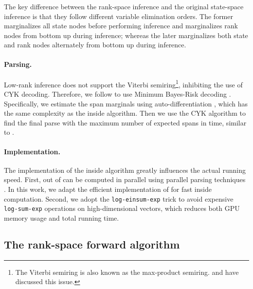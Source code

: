 \documentclass[11pt]{article}
\begin{document}
The key difference between the rank-space inference and the original state-space inference is that they follow different variable elimination orders. The former marginalizes all state nodes before performing inference and marginalizes rank nodes from bottom up during inference; whereas the later marginalizes both state and rank nodes alternately from bottom up during inference.

\paragraph{Parsing.} Low-rank inference does not support the Viterbi semiring\footnote{The Viterbi semiring is also known as the max-product semiring. \citet[][]{chiu2021low} and \citet[][]{yang-etal-2021-pcfgs} have discussed this issue.}, inhibiting the use of CYK decoding. Therefore, we follow \citet{yang-etal-2021-pcfgs} to use Minimum Bayes-Risk decoding \citep{goodman-1996-parsing}. Specifically, we estimate the span marginals using auto-differentiation \cite{eisner-2016-inside,rush-2020-torch}, which has the same complexity as the inside algorithm. Then we use the CYK algorithm to find the final parse with the maximum number of expected spans in  time, similar to \citet{smith-eisner-2006-minimum}. 



\paragraph{Implementation.} The implementation of the inside algorithm greatly influences the actual running speed. First,  out of  can be computed in parallel using parallel parsing techniques \cite{yi-etal-2011-efficient, canny-etal-2013-multi, DBLP:conf/ijcai/ZhangZL20, rush-2020-torch}. In this work, we adapt the efficient implementation of \citet{DBLP:conf/ijcai/ZhangZL20} for fast inside computation. Second, we adopt the \texttt{log-einsum-exp} trick \cite{DBLP:conf/icml/PeharzLVS00BKG20} to avoid expensive \texttt{log-sum-exp} operations on high-dimensional vectors, which reduces both GPU memory usage and total running time.

\subsection{The rank-space forward algorithm}
\label{sec:rank-forward}
\end{document}
